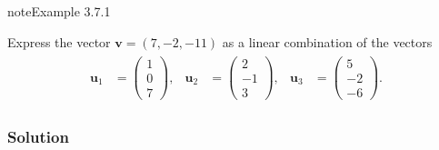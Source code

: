 \documentclass[letterpaper,10pt,english]{jupyterBook}
\begin{document}
\begin{sphinxadmonition}{note}{Example 3.7.1}



\sphinxAtStartPar
Express the vector \(\mathbf{v} = (7, -2, -11)\) as a linear combination of the vectors
\begin{equation*}
\begin{split} \begin{align*}
    \mathbf{u}_1 &= \begin{pmatrix} 1 \\ 0 \\ 7 \end{pmatrix}, &
    \mathbf{u}_2 &= \begin{pmatrix} 2 \\ -1 \\ 3 \end{pmatrix}, &
    \mathbf{u}_3 &= \begin{pmatrix} 5 \\ -2 \\ -6 \end{pmatrix}.
\end{align*} \end{split}
\end{equation*}\subsubsection*{Solution}


\end{sphinxadmonition}
\end{document}
